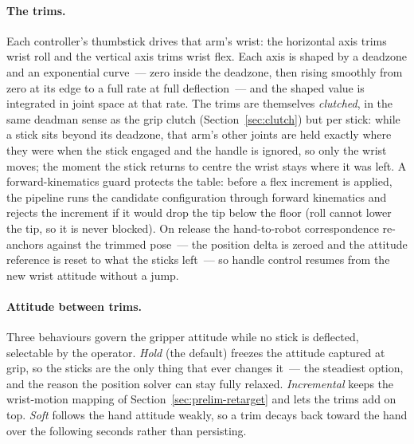 \paragraph{The trims.}
Each controller's thumbstick drives that arm's wrist: the horizontal axis
trims wrist roll and the vertical axis trims wrist flex. Each axis is
shaped by a deadzone and an exponential curve~--- zero inside the
deadzone, then rising smoothly from zero at its edge to a full rate at
full deflection~--- and the shaped value is integrated in joint space at
that rate. The trims are themselves \emph{clutched}, in the same
deadman sense as the grip clutch (Section~\ref{sec:clutch}) but per
stick: while a stick sits beyond its deadzone, that arm's other joints
are held exactly where they were when the stick engaged and the handle is
ignored, so only the wrist moves; the moment the stick returns to centre
the wrist stays where it was left. A forward-kinematics guard protects
the table: before a flex increment is applied, the pipeline runs the
candidate configuration through forward kinematics and rejects the
increment if it would drop the tip below the floor (roll cannot lower the
tip, so it is never blocked). On release the hand-to-robot correspondence
re-anchors against the trimmed pose~--- the position delta is zeroed and
the attitude reference is reset to what the sticks left~--- so handle
control resumes from the new wrist attitude without a jump.

\paragraph{Attitude between trims.}
Three behaviours govern the gripper attitude while no stick is deflected,
selectable by the operator. \emph{Hold} (the default) freezes the
attitude captured at grip, so the sticks are the only thing that ever
changes it~--- the steadiest option, and the reason the position solver
can stay fully relaxed. \emph{Incremental} keeps the wrist-motion mapping
of Section~\ref{sec:prelim-retarget} and lets the trims add on top.
\emph{Soft} follows the hand attitude weakly, so a trim decays back
toward the hand over the following seconds rather than persisting.

